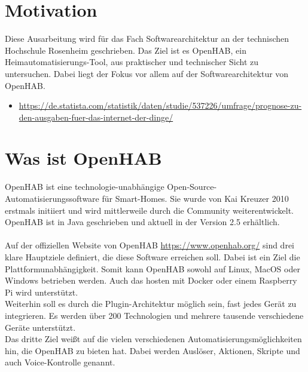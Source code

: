 \section{Motivation}
Diese Ausarbeitung wird für das Fach Softwarearchitektur an der technischen Hochschule Rosenheim geschrieben.
Das Ziel ist es OpenHAB, ein Heimautomatisierungs-Tool, aus praktischer und technischer Sicht zu untersuchen. Dabei liegt der Fokus vor allem auf der Softwarearchitektur von OpenHAB.
\begin{itemize}
	\item \url{https://de.statista.com/statistik/daten/studie/537226/umfrage/prognose-zu-den-ausgaben-fuer-das-internet-der-dinge/}
\end{itemize}

\section{Was ist OpenHAB}
OpenHAB ist eine technologie-unabhängige Open-Source-Automatisierungssoftware für Smart-Homes.
Sie wurde von Kai Kreuzer 2010 erstmals initiiert und wird mittlerweile durch die Community weiterentwickelt. OpenHAB ist in Java geschrieben und aktuell in der Version 2.5 erhältlich.\\
\\
Auf der offiziellen Website von OpenHAB \url{https://www.openhab.org/} sind drei klare Hauptziele definiert, die diese Software erreichen soll. Dabei ist ein Ziel die Plattformunabhängigkeit. Somit kann OpenHAB sowohl auf Linux, MacOS oder Windows betrieben werden. Auch das hosten mit Docker oder einem Raspberry Pi wird unterstützt.\\
Weiterhin soll es durch die Plugin-Architektur  möglich sein, fast jedes Gerät zu integrieren.
Es werden über 200 Technologien und mehrere tausende verschiedene Geräte unterstützt.\\
Das dritte Ziel weißt auf die vielen verschiedenen Automatisierungsmöglichkeiten hin, die OpenHAB zu bieten hat. Dabei werden Auslöser, Aktionen, Skripte und auch Voice-Kontrolle genannt.

